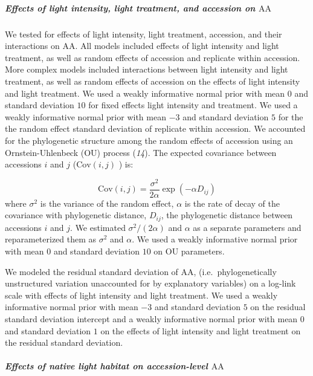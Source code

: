 \documentclass[
  letterpaper,
  DIV=11,
  numbers=noendperiod]{scrartcl}
\let\oldsubparagraph\subparagraph
\renewcommand{\subparagraph}[1]{\oldsubparagraph{#1}\mbox{}}
\newcommand{\aax}{$\mathrm{AA}$}
\begin{document}
\subparagraph{\texorpdfstring{Effects of light intensity, light
treatment, and accession on
\aax}{Effects of light intensity, light treatment, and accession on }}\label{effects-of-light-intensity-light-treatment-and-accession-on}

We tested for effects of light intensity, light treatment, accession,
and their interactions on \aax. All models included effects of light
intensity and light treatment, as well as random effects of accession
and replicate within accession. More complex models included
interactions between light intensity and light treatment, as well as
random effects of accession on the effects of light intensity and light
treatment. We used a weakly informative normal prior with mean \(0\) and
standard deviation \(10\) for fixed effects light intensity and
treatment. We used a weakly informative normal prior with mean \(-3\)
and standard deviation \(5\) for the the random effect standard
deviation of replicate within accession. We accounted for the
phylogenetic structure among the random effects of accession using an
Ornstein-Uhlenbeck (OU) process (\emph{14}). The expected covariance
between accessions \(i\) and \(j\) (\(\text{Cov}(i, j)\) ) is:

\[\text{Cov}(i, j) = \frac{\sigma^2}{2 \alpha} \exp(-\alpha D_{ij})\]
where \(\sigma^2\) is the variance of the random effect, \(\alpha\) is
the rate of decay of the covariance with phylogenetic distance,
\(D_{ij}\), the phylogenetic distance between accessions \(i\) and
\(j\). We estimated \(\sigma^2 / (2 \alpha)\) and \(\alpha\) as a
separate parameters and reparameterized them as \(\sigma^2\) and
\(\alpha\). We used a weakly informative normal prior with mean \(0\)
and standard deviation \(10\) on OU parameters.

We modeled the residual standard deviation of \aax,
(i.e.~phylogenetically unstructured variation unaccounted for by
explanatory variables) on a log-link scale with effects of light
intensity and light treatment. We used a weakly informative normal prior
with mean \(-3\) and standard deviation \(5\) on the residual standard
deviation intercept and a weakly informative normal prior with mean
\(0\) and standard deviation \(1\) on the effects of light intensity and
light treatment on the residual standard deviation.

\subparagraph{\texorpdfstring{Effects of native light habitat on
accession-level
\aax}{Effects of native light habitat on accession-level }}\label{effects-of-native-light-habitat-on-accession-level}
\end{document}
